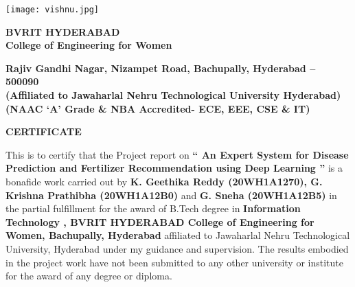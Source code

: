 \documentclass[12pt, English]{article}
\newcommand\tab[1][1cm]{\hspace*{#1}}
\begin{document}
\begin{titlepage}
\vspace*{-0.5in}
\begin{center}
\texttt{[image: vishnu.jpg]}
\end{center}
\begin{center}
\begin{large}
\textbf{BVRIT HYDERABAD\\ College of Engineering for Women}\\
\end{large}
\begin{footnotesize}
\textbf{ Rajiv Gandhi Nagar, Nizampet Road, Bachupally, Hyderabad – 500090}\\
\vspace*{0.1in}
\textbf{(Affiliated to Jawaharlal Nehru Technological University Hyderabad)}\\
\textbf{(NAAC ‘A’ Grade \& NBA Accredited- ECE, EEE, CSE \& IT)}\\
\end{footnotesize}
\end{center}
\begin{center}
    \textbf{\large CERTIFICATE}\\
\end{center}

\begin{normalsize}


This is to certify that the Project report on {\textbf{“ An Expert System for Disease Prediction and Fertilizer Recommendation using Deep Learning ”}} is a bonafide work carried out by  {\textbf{K. Geethika Reddy (20WH1A1270), G. Krishna Prathibha (20WH1A12B0)}} and {\textbf{G. Sneha (20WH1A12B5)}} in the partial fulfillment for the award of B.Tech degree in \textbf{Information Technology , BVRIT HYDERABAD College of Engineering for Women, Bachupally, Hyderabad} affiliated to Jawaharlal Nehru Technological University, Hyderabad under my guidance and supervision.
\newline
\tab The results embodied in the project work have not been submitted to any other university or institute for the award of any degree or diploma.
\end{normalsize}


\vspace*{0.6in}


\end{titlepage}
\end{document}
